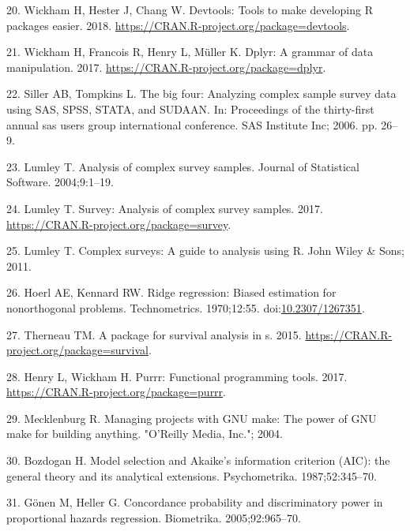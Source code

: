 \documentclass[12pt,oneside]{reedthesis}
\theoremstyle{definition}
\theoremstyle{definition}
\theoremstyle{definition}
\theoremstyle{remark}
\begin{document}
\leavevmode\hypertarget{ref-devtools_2018}{}%
20. Wickham H, Hester J, Chang W. Devtools: Tools to make developing R
packages easier. 2018.
\url{https://CRAN.R-project.org/package=devtools}.

\leavevmode\hypertarget{ref-dplyr_2017}{}%
21. Wickham H, Francois R, Henry L, Müller K. Dplyr: A grammar of data
manipulation. 2017. \url{https://CRAN.R-project.org/package=dplyr}.

\leavevmode\hypertarget{ref-Siller_2006}{}%
22. Siller AB, Tompkins L. The big four: Analyzing complex sample survey
data using SAS, SPSS, STATA, and SUDAAN. In: Proceedings of the
thirty-first annual sas users group international conference. SAS
Institute Inc; 2006. pp. 26--9.

\leavevmode\hypertarget{ref-Lumley_2004}{}%
23. Lumley T. Analysis of complex survey samples. Journal of Statistical
Software. 2004;9:1--19.

\leavevmode\hypertarget{ref-survey_2017}{}%
24. Lumley T. Survey: Analysis of complex survey samples. 2017.
\url{https://CRAN.R-project.org/package=survey}.

\leavevmode\hypertarget{ref-Lumley_2011}{}%
25. Lumley T. Complex surveys: A guide to analysis using R. John Wiley
\& Sons; 2011.

\leavevmode\hypertarget{ref-Hoerl_1970}{}%
26. Hoerl AE, Kennard RW. Ridge regression: Biased estimation for
nonorthogonal problems. Technometrics. 1970;12:55.
doi:\href{https://doi.org/10.2307/1267351}{10.2307/1267351}.

\leavevmode\hypertarget{ref-survival_2015}{}%
27. Therneau TM. A package for survival analysis in s. 2015.
\url{https://CRAN.R-project.org/package=survival}.

\leavevmode\hypertarget{ref-purrr_2017}{}%
28. Henry L, Wickham H. Purrr: Functional programming tools. 2017.
\url{https://CRAN.R-project.org/package=purrr}.

\leavevmode\hypertarget{ref-Mecklenburg_2004}{}%
29. Mecklenburg R. Managing projects with GNU make: The power of GNU
make for building anything. "O'Reilly Media, Inc."; 2004.

\leavevmode\hypertarget{ref-Bozdogan_1987}{}%
30. Bozdogan H. Model selection and Akaike's information criterion
(AIC): the general theory and its analytical extensions. Psychometrika.
1987;52:345--70.

\leavevmode\hypertarget{ref-Gonen_2005}{}%
31. Gönen M, Heller G. Concordance probability and discriminatory power
in proportional hazards regression. Biometrika. 2005;92:965--70.
\end{document}
